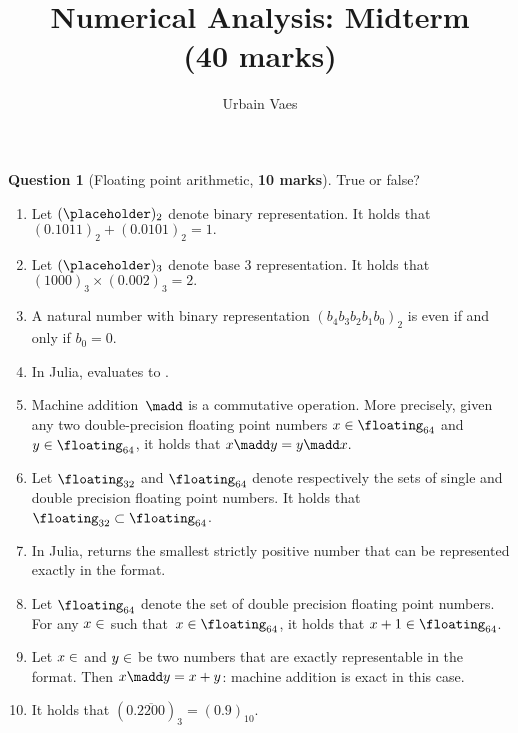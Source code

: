 \documentclass[10pt]{article}
\theoremstyle{definition}
\newtheorem{question}{Question}
\theoremstyle{remark}
\begin{document}
\title{Numerical Analysis: Midterm \\
\small{(\textbf{40 marks})}}
\author{Urbain Vaes}
\maketitle

\begin{question}
    [Floating point arithmetic, \textbf{10 marks}]
    True or false?
    \begin{enumerate}
        \item
            Let $(\placeholder)_2$ denote binary representation.
            It holds that
            \(
                (0.1011)_2 + (0.0101)_2 = 1.
            \)

        \item
            Let $(\placeholder)_3$ denote base 3 representation.
            It holds that
            \(
                (1000)_3 \times (0.002)_3 = 2.
            \)

        \item
            A natural number with binary representation $(b_4 b_3 b_2 b_1 b_0)_2$ is even if and only if $b_0 = 0$.

        \item
            In Julia,  evaluates to .

        \item
            Machine addition~$\madd$ is a commutative operation.
            More precisely, given any two double-precision floating point numbers $x \in \floating_{64}$ and $y \in \floating_{64}$,
            it holds that
            \(
                x \madd y = y \madd x.
            \)

        \item
            Let $\floating_{32}$ and $\floating_{64}$ denote respectively the sets of single and double precision floating point numbers.
            It holds that $\floating_{32} \subset \floating_{64}$.

        \item
            In Julia,  returns the smallest strictly positive number that can be represented exactly in the  format.

        \item
            Let $\floating_{64}$ denote the set of double precision floating point numbers.
            For any $x \in \real$ such that~$x \in \floating_{64}$,
            it holds that $x + 1 \in \floating_{64}$.

        \item
            Let $x \in \real$ and $y \in \real$ be two numbers that are exactly representable in the  format.
            Then $x \madd y = x + y$: machine addition is exact in this case.

        \item
            It holds that $(0.\overline{2200})_3 = (0.9)_{10}$.
    \end{enumerate}
\end{question}
\end{document}
